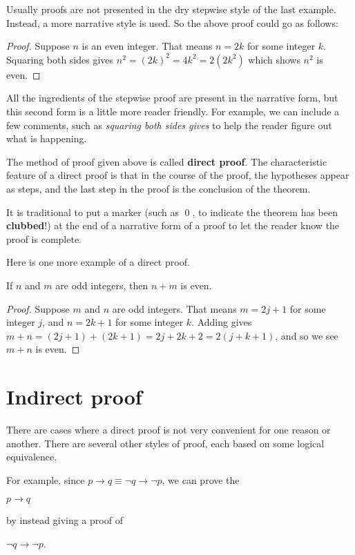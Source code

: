 Usually proofs are not presented in the dry  stepwise style of the last example. Instead, a
more narrative style is used. So the above proof could go as follows:

\begin{proof}
Suppose $n$ is an even integer. That means $n=2k$ for some integer $k$. 
Squaring both sides gives $n^2=(2k)^2 = 4k^2 = 2(2k^2)$ which shows $n^2$ is even.
\end{proof}


All the ingredients of the stepwise proof are present in the narrative form, but this second form
 is a little more reader friendly. For example, we can include a few 
comments, such as {\itshape squaring both sides gives} to help the reader figure
out what is happening. 

The method of proof given above is called {\bfseries direct proof}. The characteristic
feature of a direct proof is that in the course of the proof, the hypotheses appear
as steps, and the last step in the proof is the conclusion of the theorem.  

It is traditional to put a marker (such as \qed, to indicate the theorem
has been {\bfseries clubbed}!) at the end of a narrative form of 
a proof to let the reader know the proof is complete.

Here is one more example of a direct proof.
\begin{thm}
If $n$ and $m$ are odd integers, then $n+m$ is even.
\end{thm} 
\begin{proof}
Suppose $m$ and $n$ are odd integers. That means $m= 2j+1$ for
some integer $j$, and $n=2k+1$ for some integer $k$. Adding gives
$m+n = (2j+1)+(2k+1) = 2j+2k+2 = 2(j+k+1)$, and so we see $m+n$ is even.
\end{proof}


\section{Indirect proof}
There are cases where a direct proof is not very convenient for one reason or 
another. There are several other styles of proof, each based on some logical
equivalence.

For example, since $p\to q \equiv \neg q\to \neg p$, we can prove
the
\begin{thm}
$p\to q$ 
\end{thm}
\noindent by instead giving a proof  of
\begin{thm}
 $\neg q\to \neg p$.
\end{thm}

